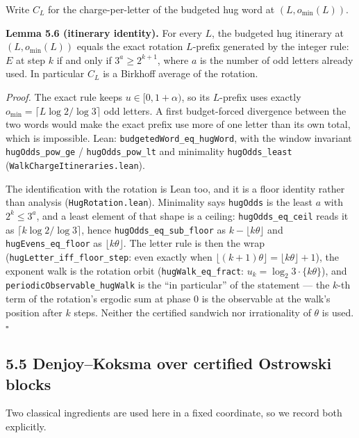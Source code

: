 \documentclass[12pt]{article}
\begin{document}
Write \(C_L\) for the charge-per-letter of the budgeted hug word at
\((L,o_{\min}(L))\).

\textbf{Lemma 5.6 (itinerary identity).} For every \(L\), the budgeted
hug itinerary at \((L,o_{\min}(L))\) equals the exact rotation
\(L\)-prefix generated by the integer rule: \(E\) at step \(k\) if and
only if \(3^a\ge 2^{k+1}\), where \(a\) is the number of odd letters
already used. In particular \(C_L\) is a Birkhoff average of the
rotation.

\emph{Proof.} The exact rule keeps \(u\in[0,1+\alpha)\), so its
\(L\)-prefix uses exactly \(o_{\min}=\lceil L\log 2/\log 3\rceil\) odd
letters. A first budget-forced divergence between the two words would
make the exact prefix use more of one letter than its own total, which
is impossible. Lean: \texttt{\nolinkurl{budgetedWord_eq_hugWord}}, with
the window invariant \texttt{\nolinkurl{hugOdds_pow_ge}} /
\texttt{\nolinkurl{hugOdds_pow_lt}} and minimality
\texttt{\nolinkurl{hugOdds_least}}
(\texttt{\nolinkurl{WalkChargeItineraries.lean}}).

The identification with the rotation is Lean too, and it is a floor
identity rather than analysis (\texttt{\nolinkurl{HugRotation.lean}}).
Minimality says \texttt{\nolinkurl{hugOdds}} is the least \(a\) with
\(2^k\le3^a\), and a least element of that shape is a ceiling:
\texttt{\nolinkurl{hugOdds_eq_ceil}} reads it as
\(\lceil k\log2/\log3\rceil\), hence
\texttt{\nolinkurl{hugOdds_eq_sub_floor}} as
\(k-\lfloor k\theta\rfloor\) and \texttt{\nolinkurl{hugEvens_eq_floor}}
as \(\lfloor k\theta\rfloor\). The letter rule is then the wrap
(\texttt{\nolinkurl{hugLetter_iff_floor_step}}: even exactly when
\(\lfloor(k+1)\theta\rfloor=\lfloor k\theta\rfloor+1\)), the exponent
walk is the rotation orbit (\texttt{\nolinkurl{hugWalk_eq_fract}}:
\(u_k=\log_2 3\cdot\{k\theta\}\)), and
\texttt{\nolinkurl{periodicObservable_hugWalk}} is the ``in particular''
of the statement --- the \(k\)-th term of the rotation's ergodic sum at
phase \(0\) is the observable at the walk's position after \(k\) steps.
Neither the certified sandwich nor irrationality of \(\theta\) is used.
\(\square\)

\subsection{5.5 Denjoy--Koksma over certified Ostrowski
blocks}\label{denjoykoksma-over-certified-ostrowski-blocks}

Two classical ingredients are used here in a fixed coordinate, so we
record both explicitly.
\end{document}
